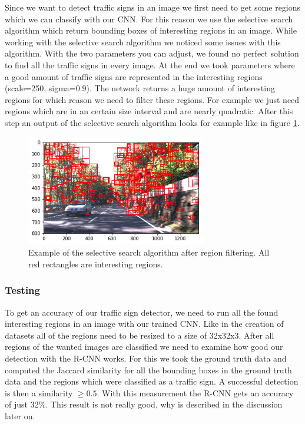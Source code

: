 \documentclass[12pt,a4paper,bibliography=totocnumbered,listof=totocnumbered]{scrartcl}
\begin{document}
Since we want to detect traffic signs in an image we first need to get some regions which we can classify with our CNN. For this reason we use the selective search algorithm which return bounding boxes of interesting regions in an image. While working with the selective search algorithm we noticed some issues with this algorithm. With the two parameters you can adjust, we found no perfect solution to find all the traffic signs in every image. At the end we took parameters where a good amount of traffic signs are represented in the interesting regions (scale=250, sigma=0.9). The network returns a huge amount of interesting regions for which reason we need to filter these regions. For example we just need regions which are in an certain size interval and are nearly quadratic. After this step an output of the selective search algorithm looks for example like in figure \ref{fig:selective_search_example}.

\begin{figure}[htbp] 
  \centering
     \includegraphics[width=0.7\textwidth]{selective_search_example}
  \caption{Example of the selective search algorithm after region filtering. All red rectangles are interesting regions.}
  \label{fig:selective_search_example}
\end{figure}

\subsubsection{Testing}

To get an accuracy of our traffic sign detector, we need to run all the found interesting regions in an image with our trained CNN. Like in the creation of datasets all of the regions need to be resized to a size of 32x32x3. After all regions of the wanted images are classified we need to examine how good our detection with the R-CNN works. For this we took the ground truth data and computed the Jaccard similarity for all the bounding boxes in the ground truth data and the regions which were classified as a traffic sign. A successful detection is then a similarity $\geq 0.5$. With this measurement the R-CNN gets an accuracy of just 32\%. This result is not really good, why is described in the discussion later on.
\end{document}
